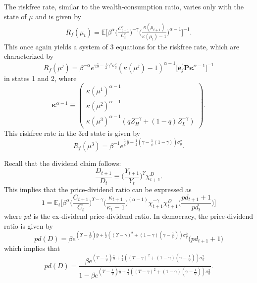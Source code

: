 \documentclass[12pt]{article}
\numberwithin{equation}{section}
\newcommand{\E}{\mathbb{E}}
\begin{document}
The riskfree rate, similar to the wealth-consumption ratio, varies only with the state of $\mu$ and is given by
\begin{align*}
R_{f}(\mu_t) = \E\bigg[\beta^{\alpha}\bigg(\frac{C^r_{t+1}}{C^r_{t}}\bigg)^{-\gamma}\bigg(\frac{\kappa(\mu_{t+1})}{\kappa(\mu_{t})-1}\bigg)^{\alpha-1}\bigg]^{-1}.
\end{align*}
This once again yields a system of 3 equations for the riskfree rate, which are characterized by
\begin{equation}
R_{f}(\mu^{j})= \beta^{-\alpha}e^{\gamma\bar{y} -\frac{1}{2}\gamma^2 \sigma_y^2}\left(\kappa(\mu^{j})-1\right)^{\alpha-1}\bigg[\mathbf{e}_j^\prime \mathbf{P}\boldsymbol\kappa^{\alpha-1}\bigg]^{-1}
\end{equation}
in states 1 and 2, where
\begin{equation}
\boldsymbol{\kappa}^{\alpha-1}\equiv\begin{pmatrix}\kappa(\mu^{1})^{\alpha-1}\\
\kappa(\mu^{2})^{\alpha-1}\\
\kappa(\mu^{3})^{\alpha-1}(qZ_H^{-\gamma} + (1-q)Z_L^{-\gamma})
\end{pmatrix}.
\end{equation}
This riskfree rate in the 3rd state is given by
\begin{equation*}
R_{f}(\mu^3)= \beta^{-1}e^{\frac{1}{\psi}\bar{y} - \frac{1}{2}(\gamma-\frac{1}{\psi}(1-\gamma))\sigma_y^2}.
\end{equation*}

Recall that the dividend claim follows:
\begin{equation*}
\frac{D_{t+1}}{D_{t}} \equiv \bigg(\frac{Y_{t+1}}{Y_{t}}\bigg)^{\Upsilon}\chi^D_{t+1}.
\end{equation*}
This implies that the price-dividend ratio can be expressed as
\begin{equation}
1=\mathbb{E}_t\bigg[\beta^{\alpha}\bigg(\frac{C_{t+1}}{C_{t}}\bigg)^{\Upsilon-\gamma}\bigg(\frac{\kappa_{t+1}}{\kappa_t - 1}\bigg)^{(\alpha-1)} \chi^{-\gamma}_{t+1}\chi^D_{t+1} \bigg(\frac{pd_{t+1}+1}{pd_{t}}\bigg)\bigg]
\end{equation}
where $pd$ is the ex-dividend price-dividend ratio. In democracy, the price-dividend ratio is given by
\begin{equation}
pd(D) = \beta e^{(\Upsilon-\frac{1}{\psi})\bar{y}+\frac{1}{2}((\Upsilon-\gamma)^2 + (1-\gamma)(\gamma-\frac{1}{\psi}))\sigma_y^{2}} \bigg(pd_{t+1}+1\bigg)
\end{equation}
which implies that 
\begin{equation}
pd(D) = \frac{\beta e^{(\Upsilon-\frac{1}{\psi})\bar{y}+\frac{1}{2}((\Upsilon-\gamma)^2 + (1-\gamma)(\gamma-\frac{1}{\psi}))\sigma_y^{2}}}{1-\beta e^{(\Upsilon-\frac{1}{\psi})\bar{y}+\frac{1}{2}((\Upsilon-\gamma)^2 + (1-\gamma)(\gamma-\frac{1}{\psi}))\sigma_y^{2}}}.
\end{equation}
\end{document}
